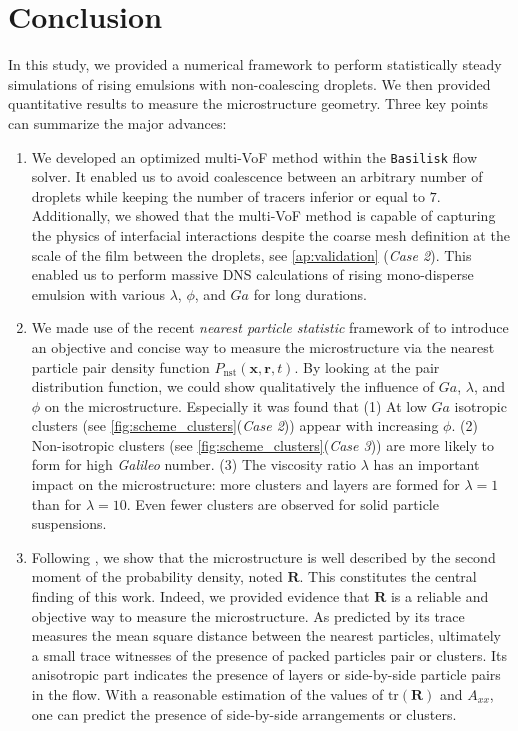 \documentclass[11pt]{My_preprint}
\begin{document}
 
\section{Conclusion}
\label{sec:conclusion}

In this study, we provided a numerical framework to perform statistically steady simulations of rising emulsions with non-coalescing droplets. 
We then provided quantitative results to measure the microstructure geometry.
Three key points can summarize the major advances:
\begin{enumerate}
\item We developed an optimized multi-VoF method within the \texttt{Basilisk} flow solver. 
    It enabled us to avoid coalescence between an arbitrary number of droplets while keeping the number of tracers inferior or equal to $7$. 
    Additionally, we showed that the multi-VoF method is capable of capturing the physics of interfacial interactions despite the coarse mesh definition at the scale of the film between the droplets, see \ref{ap:validation} (\textit{Case 2}). 
    This enabled us to perform massive DNS calculations of rising mono-disperse emulsion with various $\lambda$, $\phi$, and $Ga$ for long durations.
    \item We made use of the recent \textit{nearest particle statistic} framework of \citet{zhang2023evolution} to introduce an objective and concise way to measure the microstructure via the nearest particle pair density function $P_\text{nst}(\textbf{x},\textbf{r},t)$. 
    By looking at the pair distribution function, we could show qualitatively the influence of $Ga$, $\lambda$, and $\phi$ on the microstructure.
    Especially it was found that 
    (1) At low $Ga$ isotropic clusters (see \ref{fig:scheme_clusters}(\textit{Case 2})) appear with increasing $\phi$. 
    (2) Non-isotropic clusters (see \ref{fig:scheme_clusters}(\textit{Case 3})) are more likely to form for high \textit{Galileo} number.
    (3) The viscosity ratio $\lambda$ has an important impact on the microstructure: more clusters and layers are formed for $\lambda = 1$ than for $\lambda = 10$. 
    Even fewer clusters are observed for solid particle suspensions. 
    \item Following \citet{zhang2023evolution}, we show that the microstructure is well described by the second moment of the probability density, noted $\textbf{R}$. 
    This constitutes the central finding of this work. Indeed, we provided evidence that $\textbf{R}$ is a reliable and objective way to measure the microstructure.
    As predicted by \citet{zhang2023evolution} its trace measures the mean square distance between the nearest particles, ultimately a small trace witnesses of the presence of packed particles pair or clusters.
    Its anisotropic part indicates the presence of layers or side-by-side particle pairs in the flow. 
    With a reasonable estimation of the values of $\text{tr}(\textbf{R})$ and $A_{xx}$, one can predict the presence of side-by-side arrangements or clusters.
\end{enumerate}
\end{document}

